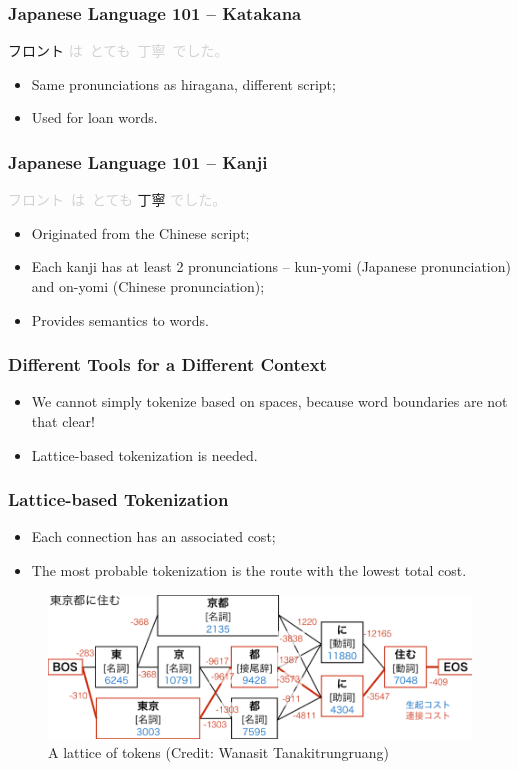 \documentclass[11pt]{beamer}
\begin{document}
	\begin{frame}
		\frametitle{Japanese Language 101 -- Katakana}
		\begin{center}
			フロント \textcolor{lightgray}{は\ とても\ 丁寧\ でした。}
		\end{center}
		\pause
		\begin{itemize}
			\item Same pronunciations as hiragana, different script;
			\pause
			\item Used for loan words.
		\end{itemize}
	\end{frame}
	
	\begin{frame}
		\frametitle{Japanese Language 101 -- Kanji}
		\begin{center}
			\textcolor{lightgray}{フロント\ は\ とても} 丁寧 \textcolor{lightgray}{でした。}
		\end{center}
		\pause
		\begin{itemize}
			\item Originated from the Chinese script;
			\item Each kanji has at least 2 pronunciations -- kun-yomi (Japanese pronunciation) and on-yomi (Chinese pronunciation);
			\item Provides semantics to words.
		\end{itemize}
	\end{frame}
	
	\begin{frame}
		\frametitle{Different Tools for a Different Context}
		\begin{itemize}
			\item We cannot simply tokenize based on spaces, because word boundaries are not that clear!
			\pause
			\item Lattice-based tokenization is needed.
		\end{itemize}
	\end{frame}
	
	\begin{frame}
		\frametitle{Lattice-based Tokenization}
		\begin{itemize}
			\item Each connection has an associated cost;
			\item The most probable tokenization is the route with the lowest total cost.\\
		\end{itemize}
		\begin{figure}
			\includegraphics[scale=0.5]{japanese_tokenization}
			\caption{A lattice of tokens (Credit: Wanasit Tanakitrungruang)}
		\end{figure}
	\end{frame}
	
\end{document}
